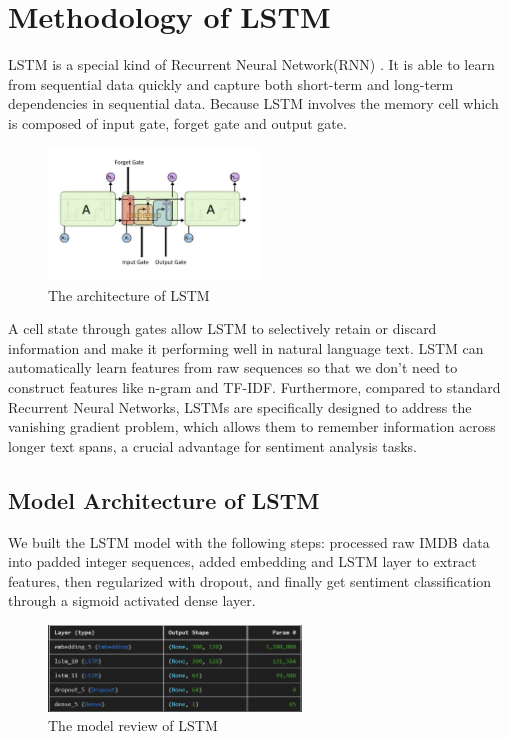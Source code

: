 \section{Methodology of LSTM}
LSTM is a special kind of Recurrent Neural Network(RNN) \cite{sak2014long}. It is able to learn from sequential data quickly and capture both short-term and long-term dependencies in sequential data. Because LSTM involves the memory cell which is composed of input gate, forget gate and output gate.

\begin{figure}[ht]
    \centering
    \includegraphics[width=0.5\textwidth]{pics/lstm_architecture.png}
    \caption{The architecture of LSTM}
\end{figure}

A cell state through gates allow LSTM to selectively retain or discard information and make it performing well in natural language text. LSTM can automatically learn features from raw sequences so that we don't need to construct features like n-gram and TF-IDF. Furthermore, compared to standard Recurrent Neural Networks, LSTMs are specifically designed to address the vanishing gradient problem, which allows them to remember information across longer text spans, a crucial advantage for sentiment analysis tasks.

\subsection{Model Architecture of LSTM}
We built the LSTM model with the following steps: processed raw IMDB data into padded integer sequences, added embedding and LSTM layer to extract features, then regularized with dropout, and finally get sentiment classification through a sigmoid activated dense layer.

\begin{figure}[ht]
    \centering
    \includegraphics[width=0.6\textwidth]{pics/lstm_model.png}
    \caption{The model review of LSTM}
\end{figure}


